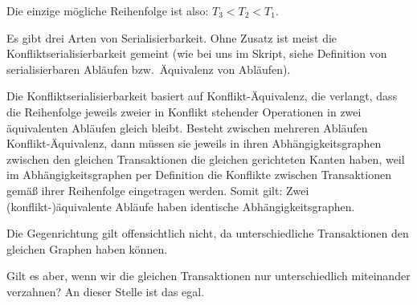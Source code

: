 \begin{enumerate}[a)]
\begin{solution}
	Die einzige mögliche Reihenfolge ist also: $T_3 < T_2 < T_1$.
\end{solution}

\begin{note}
Es gibt drei Arten von Serialisierbarkeit.
Ohne Zusatz ist meist die Konfliktserialisierbarkeit gemeint (wie bei uns im Skript, siehe Definition von serialisierbaren Abläufen bzw.\ Äquivalenz von Abläufen).

Die Konfliktserialisierbarkeit basiert auf Konflikt-Äquivalenz, die verlangt, dass die Reihenfolge jeweils zweier in Konflikt stehender Operationen in zwei äquivalenten Abläufen gleich bleibt.
Besteht zwischen mehreren Abläufen Konflikt-Äquivalenz, dann müssen sie jeweils in ihren Abhängigkeitsgraphen zwischen den gleichen Transaktionen die gleichen gerichteten Kanten haben, weil im Abhängigkeitsgraphen per Definition die Konflikte zwischen Transaktionen gemäß ihrer Reihenfolge eingetragen werden.
Somit gilt: Zwei (konflikt-)äquivalente Abläufe haben identische Abhängigkeitsgraphen.

Die Gegenrichtung gilt offensichtlich nicht, da unterschiedliche Transaktionen den gleichen Graphen haben können.

Gilt es aber, wenn wir die gleichen Transaktionen nur unterschiedlich miteinander verzahnen? An dieser Stelle ist das egal.
\end{note}

\end{enumerate}
